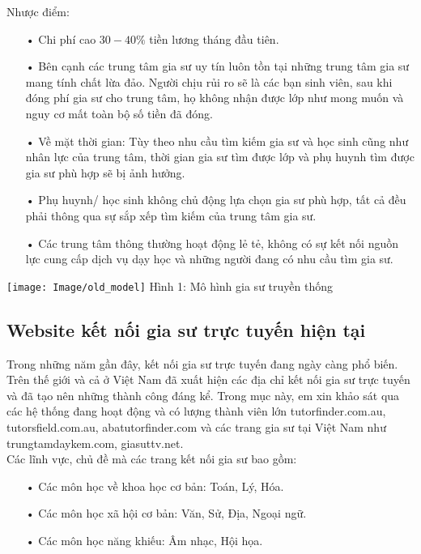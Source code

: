 \documentclass[12pt,a4paper]{report}
\begin{document}
Nhược điểm: 
\begin{itemize}
\item[•]Chi phí cao $30-40\%$ tiền lương tháng đầu tiên.
\item[•]Bên cạnh các trung tâm gia sư uy tín luôn tồn tại những trung tâm gia sư mang tính chất lừa đảo. Người chịu rủi ro sẽ là các bạn sinh viên, sau khi đóng phí gia sư cho trung tâm, họ không nhận được lớp như mong muốn và nguy cơ mất toàn bộ số tiền đã đóng.
\item[•]Về mặt thời gian: Tùy theo nhu cầu tìm kiếm gia sư và học sinh cũng như nhân lực của trung tâm, thời gian gia sư tìm được lớp và phụ huynh tìm được gia sư phù hợp sẽ bị ảnh hưởng.
\item[•]Phụ huynh/ học sinh không chủ động lựa chọn gia sư phù hợp, tất cả đều phải thông qua sự sắp xếp tìm kiếm của trung tâm gia sư.
\item[•]Các trung tâm thông thường hoạt động lẻ tẻ, không có sự kết nối nguồn lực cung cấp dịch vụ dạy học và những người đang có nhu cầu tìm gia sư. 
\end{itemize}
\begin{center}
    \begin{center}
     \texttt{[image: Image/old\_model]}
     Hình 1: Mô hình gia sư truyền thống
    \end{center}
\end{center}
\subsection{Website kết nối gia sư trực tuyến hiện tại}
Trong những năm gần đây, kết nối gia sư trực tuyến đang ngày càng phổ biến.
Trên thế giới và cả ở Việt Nam đã xuất hiện các địa chỉ kết nối gia sư trực tuyến và
đã tạo nên những thành công đáng kể. Trong mục này, em xin khảo sát qua các hệ
thống đang hoạt động và có lượng thành viên lớn tutorfinder.com.au,
tutorsfield.com.au, abatutorfinder.com và các trang gia sư tại Việt Nam như
trungtamdaykem.com, giasuttv.net.\\

Các lĩnh vực, chủ đề mà các trang kết nối gia sư bao gồm:
\begin{itemize}
\item[•]Các môn học về khoa học cơ bản: Toán, Lý, Hóa.
\item[•]Các môn học xã hội cơ bản: Văn, Sử, Địa, Ngoại ngữ.
\item[•]Các môn học năng khiếu: Âm nhạc, Hội họa.
\end{itemize}
\end{document}
